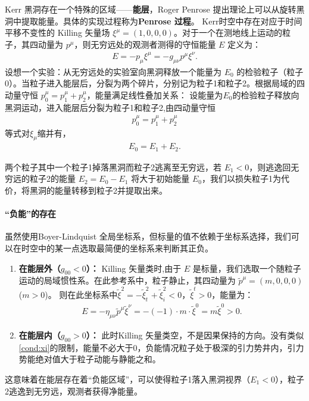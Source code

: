 Kerr 黑洞存在一个特殊的区域——\textbf{能层}，Roger Penrose 提出理论上可以从旋转黑洞中提取能量。具体的实现过程称为\textbf{Penrose 过程}。
Kerr时空中存在对应于时间平移不变性的 Killing 矢量场 $\xi^{\mu} = (1, 0, 0, 0)$。对于一个在测地线上运动的粒子，其四动量为 $p^{\mu}$，则无穷远处的观测者测得的守恒能量 $E$ 定义为：
\begin{align}
E = -p_{\mu}\xi^{\mu} = -g_{\mu\nu}p^{\mu}\xi^{\nu}.
\end{align}
设想一个实验：从无穷远处的实验室向黑洞释放一个能量为 $E_0$ 的检验粒子（粒子0）。当粒子进入能层后，分裂为两个碎片，分别记为粒子1和粒子2。根据局域的四动量守恒 $p_0^{\mu} = p_1^{\mu} + p_2^{\mu}$，能量满足线性叠加关系：
设能量为$E_0$的检验粒子释放向黑洞运动，进入能层后分裂为粒子1和粒子2,由四动量守恒
\begin{align}
    p^{\mu}_0 = p^{\mu}_1 + p^{\mu}_2
\end{align}
等式对$\xi_{\mu}$缩并有，
\begin{align}
E_0 = E_1 + E_2.
\end{align}

两个粒子其中一个粒子1掉落黑洞而粒子2逃离至无穷远，若 $E_1 < 0$，则逃逸回无穷远的粒子2的能量 $E_2 = E_0 - E_1$ 将大于初始能量 $E_0$，我们以损失粒子1为代价，将黑洞的能量转移到粒子2并提取出来。

\paragraph{“负能”的存在}
 虽然使用Boyer-Lindquist 全局坐标系，但标量的值不依赖于坐标系选择，我们可以在时空中的某一点选取最简便的坐标系来判断其正负。

\begin{enumerate}
    \item \textbf{在能层外（$g_{00} < 0$）：}
    Killing 矢量类时,由于 $E$ 是标量，我们选取一个随粒子运动的局域惯性系。在此参考系中，粒子静止，其四动量为 $\tilde{p}^{\mu} = (m, 0, 0, 0)$ ($m>0$)。
    则在此坐标系中$\tilde{\xi}^{2} = -\tilde{\xi}^2_{t}+\tilde{\xi}^2_{i} < 0$，$\tilde{\xi}^t>0$，能量为：
    \begin{align}
        E = -\eta_{\mu\nu}\tilde{p}^{\mu}\tilde{\xi}^{\nu} = -(-1) \cdot m \cdot \tilde{\xi}^0 = m \tilde{\xi}^0 > 0.
        \label{cond:xi}
    \end{align}
    \item \textbf{在能层内（$g_{00} > 0$）：}
    此时Killing 矢量类空，不是因果保持的方向。没有类似\eqref{cond:xi}的限制，能量不必大于0，负能情况粒子处于极深的引力势井内，引力势能绝对值大于粒子动能与静能之和。
\end{enumerate}
这意味着在能层存在着“负能区域”，可以使得粒子1落入黑洞视界（$E_1 < 0$），粒子2逃逸到无穷远，观测者获得净能量。

